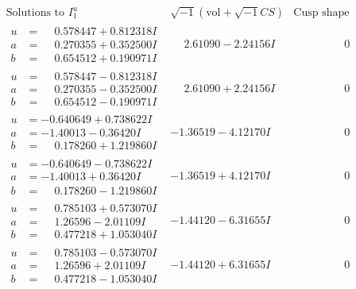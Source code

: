 \documentclass[1p]{elsarticle_modified}
\theoremstyle{definition}
\newcommand{\I}{\sqrt{-1}}
\begin{document}
$$\begin{array}{c|c|c}  
\text{Solutions to }I^u_{1}& \I (\text{vol} + \sqrt{-1}CS) & \text{Cusp shape}\\
 \hline 
\begin{aligned}
u &= \phantom{-}0.578447 + 0.812318 I \\
a &= \phantom{-}0.270355 + 0.352500 I \\
b &= \phantom{-}0.654512 + 0.190971 I\end{aligned}
 & \phantom{-}2.61090 - 2.24156 I & \phantom{-0.000000 } 0 \\ \hline\begin{aligned}
u &= \phantom{-}0.578447 - 0.812318 I \\
a &= \phantom{-}0.270355 - 0.352500 I \\
b &= \phantom{-}0.654512 - 0.190971 I\end{aligned}
 & \phantom{-}2.61090 + 2.24156 I & \phantom{-0.000000 } 0 \\ \hline\begin{aligned}
u &= -0.640649 + 0.738622 I \\
a &= -1.40013 - 0.36420 I \\
b &= \phantom{-}0.178260 + 1.219860 I\end{aligned}
 & -1.36519 - 4.12170 I & \phantom{-0.000000 } 0 \\ \hline\begin{aligned}
u &= -0.640649 - 0.738622 I \\
a &= -1.40013 + 0.36420 I \\
b &= \phantom{-}0.178260 - 1.219860 I\end{aligned}
 & -1.36519 + 4.12170 I & \phantom{-0.000000 } 0 \\ \hline\begin{aligned}
u &= \phantom{-}0.785103 + 0.573070 I \\
a &= \phantom{-}1.26596 - 2.01109 I \\
b &= \phantom{-}0.477218 + 1.053040 I\end{aligned}
 & -1.44120 - 6.31655 I & \phantom{-0.000000 } 0 \\ \hline\begin{aligned}
u &= \phantom{-}0.785103 - 0.573070 I \\
a &= \phantom{-}1.26596 + 2.01109 I \\
b &= \phantom{-}0.477218 - 1.053040 I\end{aligned}
 & -1.44120 + 6.31655 I & \phantom{-0.000000 } 0 \\ \hline\begin{aligned}

\end{aligned}
\end{array}$$
\end{document}
